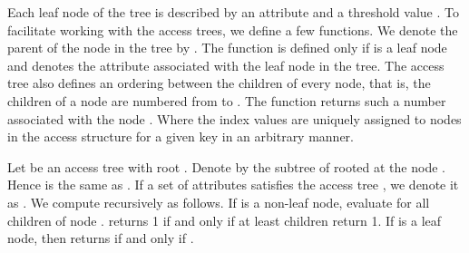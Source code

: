 \documentclass[10pt,journal]{IEEEtran}
\begin{document}
Each leaf node  of the tree is described by an attribute and a threshold value .
To facilitate working with the access trees, we define a few functions. We denote the
parent of the node  in the tree by . The function  is defined only if  is a
leaf node and denotes the attribute associated with the leaf node  in the tree. The access
tree  also defines an ordering between the children of every node, that is, the children
of a node are numbered from  to . The function  returns such a number
associated with the node . Where the index values are uniquely assigned to nodes in the
access structure for a given key in an arbitrary manner.

Let  be an access tree with root . Denote by  the subtree
of  rooted at the node . Hence  is the same as . If a set of attributes  satisfies the
access tree , we denote it as . We compute  recursively as follows. If  is a
non-leaf node, evaluate  for all children 
of node .  returns 1 if and only if at
least  children return 1. If  is a leaf node, then  returns  if and only if .
\end{document}
